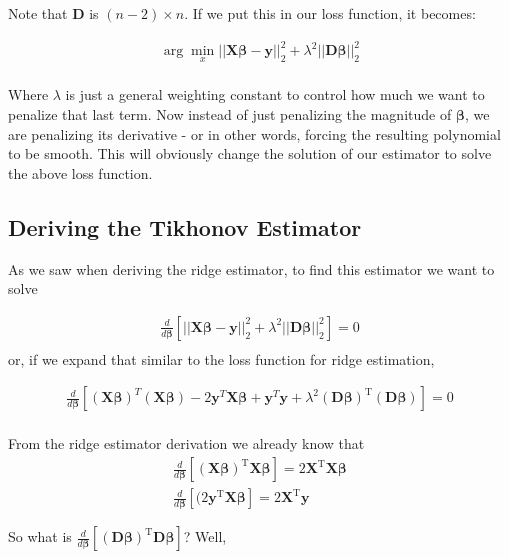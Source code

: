 \documentclass{article}
\newcommand{\y}{\mathbf{y}}
\newcommand{\X}{\mathbf{X}}
\newcommand{\B}{\boldsymbol\beta} %
\newcommand{\D}{\mathbf{D}}
\begin{document}
Note that $\D$ is $(n-2) \times n $. If we put this in our loss function, it becomes: 

\begin{align*}
\arg \min_{x} ||\X\B-\y||_{2}^{2} + \lambda^2||\D \B||_{2}^{2} \\
\end{align*}

Where $\lambda$ is just a general weighting constant to control how much we want to penalize that last term. Now instead of just penalizing the magnitude of $\B$, we are penalizing its derivative - or in other words, forcing the resulting polynomial to be smooth. This will obviously change the solution of our estimator to solve the above loss function. 


\subsection{Deriving the Tikhonov Estimator}

As we saw when deriving the ridge estimator, to find this estimator we want to solve

\begin{align*}
\frac{d}{d\B} \left[ ||\X\B-\y||_{2}^{2} + \lambda^2||\D \B||_{2}^{2} \right] = 0 \\
\end{align*}
or, if we expand that similar to the loss function for ridge estimation, 

\begin{align*}
\frac{d}{d\B} \left[ (\X\B)^T(\X\B) -2 \y^T \X\B + \y^T \y + \lambda^2(\D\B)^{\textrm{T}}(\D\B) \right] = 0 \\
\end{align*}

From the ridge estimator derivation we already know that 
\begin{align*}
\frac{d}{d\B} [ (\X\B)^{\textrm{T}} \X\B ] = 2\X^{\textrm{T}}\X\B \\
\frac{d}{d\B} [ (2\y^{\textrm{T}} \X\B ] = 2\X^{\textrm{T}}\y
\end{align*}

So what is $\frac{d}{d\B} [ (\D\B)^{\textrm{T}}\D\B ] $? Well, 
\end{document}
